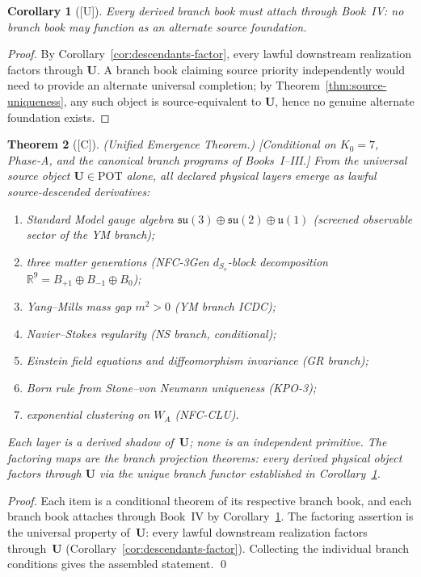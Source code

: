 \documentclass[12pt,oneside]{amsbook}
\theoremstyle{plain}
\newtheorem{theorem}{Theorem}[section]
\newtheorem{corollary}[theorem]{Corollary}
\theoremstyle{definition}
\theoremstyle{remark}
\newcommand{\status}[1]{\textup{[#1]}}
\begin{document}
\begin{corollary}[\status{U}]\label{cor:all-branches-through-U}
Every derived branch book must attach through Book~IV: no branch book
may function as an alternate source foundation.
\end{corollary}

\begin{proof}
By Corollary~\ref{cor:descendants-factor}, every lawful downstream
realization factors through $\mathbf{U}$.  A branch book claiming
source priority independently would need to provide an alternate
universal completion; by Theorem~\ref{thm:source-uniqueness}, any such
object is source-equivalent to $\mathbf{U}$, hence no genuine alternate
foundation exists.
\end{proof}

\begin{theorem}[\status{C}]\label{thm:unified-emergence}
\textup{(Unified Emergence Theorem.)}
\textup{[Conditional on $K_0=7$, Phase-A, and the canonical
branch programs of Books~I--III.]}
From the universal source object $\mathbf{U} \in \mathrm{POT}$
alone, all declared physical layers emerge as lawful
source-descended derivatives:
\begin{enumerate}[label=\textup{(\roman*)}]
  \item Standard Model gauge algebra
    $\mathfrak{su}(3)\oplus\mathfrak{su}(2)\oplus\mathfrak{u}(1)$
    (screened observable sector of the YM branch);
  \item three matter generations (NFC-3Gen $d_{S_v}$-block
    decomposition $\mathbb{R}^9 = B_{+1}\oplus B_{-1}\oplus B_0$);
  \item Yang--Mills mass gap $m^2 > 0$ (YM branch ICDC);
  \item Navier--Stokes regularity (NS branch, conditional);
  \item Einstein field equations and diffeomorphism invariance
    (GR branch);
  \item Born rule from Stone--von Neumann uniqueness (KPO-3);
  \item exponential clustering on $W_A$ (NFC-CLU).
\end{enumerate}
Each layer is a derived shadow of~$\mathbf{U}$; none is an
independent primitive.  The factoring maps are the branch
projection theorems: every derived physical object factors through
$\mathbf{U}$ via the unique branch functor established in
Corollary~\ref{cor:all-branches-through-U}.
\end{theorem}

\begin{proof}
Each item is a conditional theorem of its respective branch book,
and each branch book attaches through Book~IV by
Corollary~\ref{cor:all-branches-through-U}.  The factoring
assertion is the universal property of~$\mathbf{U}$:
every lawful downstream realization factors through~$\mathbf{U}$
(Corollary~\ref{cor:descendants-factor}).  Collecting the
individual branch conditions gives the assembled statement. \qed
\end{proof}
\end{document}
